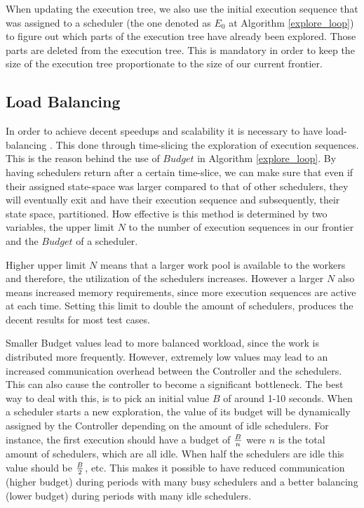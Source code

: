 When updating the execution tree, we also use the initial execution sequence that was assigned to a scheduler
(the one denoted as $E_0$ at Algorithm \ref{explore_loop}) to figure out which parts of the execution tree have
already been explored. Those parts are deleted from the execution tree. 
This is mandatory in order to keep the size of the execution tree proportionate to the size of our current frontier.


\subsection{Load Balancing}

In order to achieve decent speedups and scalability it is necessary to have load-balancing \cite{Simsa2012ScalableDP}.
This done through time-slicing \cite{wiki:timeslice} the exploration of execution sequences. This is the reason
behind the use of $Budget$ in Algorithm \ref{explore_loop}. By having schedulers return after a certain time-slice,
we can make sure that even if their assigned state-space was larger compared to that of other schedulers, they will
eventually exit and have their execution sequence and subsequently, their state space, partitioned. How effective
is this method is determined by two variables, the upper limit $N$ to the number of execution sequences in our
frontier and the $Budget$ of a scheduler.

Higher upper limit $N$ means that a larger work pool is available to the workers and therefore, the utilization of the schedulers
increases.
However a larger $N$ also means increased memory requirements, since more execution sequences are active at each time.
Setting this limit to double the amount of schedulers, produces the decent results for most test cases\cite{Simsa2012ScalableDP}.

Smaller Budget values lead to more balanced workload, since the work is distributed more frequently. However,
extremely low values may lead to an increased communication overhead between the Controller and the schedulers.
This can also cause the controller to become a significant bottleneck. The best way to deal with this,
is to pick an initial value $B$ of around 1-10 seconds. When a scheduler starts a new exploration,
the value of its budget will be dynamically assigned by the Controller depending on the amount of
idle schedulers. For instance, the first execution should have a budget of $B \over n$ were $n$ is the total amount of
schedulers, which are all idle. When half the schedulers are idle this value should be $B \over 2$, etc. This makes it possible to have
reduced communication (higher budget) during periods with many busy schedulers and a better balancing
(lower budget) during periods with many idle schedulers.

